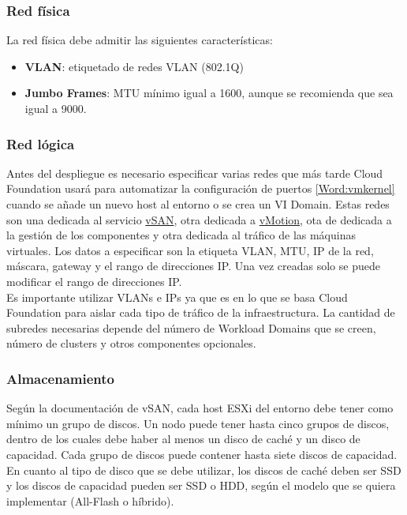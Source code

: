 \subsubsection{Red física}
\label{subsubsec:redFisica}
La red física debe admitir las siguientes características:
\begin{itemize}
    \item \textbf{VLAN}: etiquetado de redes VLAN (802.1Q)
    \item \textbf{Jumbo Frames}: MTU mínimo igual a 1600, aunque se recomienda que sea igual a 9000.
\end{itemize}

\subsubsection{Red lógica}
\label{subsubsec:redLogicaCF}
Antes del despliegue es necesario especificar varias redes que más tarde Cloud Foundation usará para automatizar la configuración de puertos \ref{Word:vmkernel} cuando se añade un nuevo host al entorno o se crea un VI Domain. Estas redes son  una dedicada al servicio \underline{vSAN}, otra dedicada a \underline{vMotion}, ota de dedicada a la gestión de los componentes y otra dedicada al tráfico de las máquinas virtuales. Los datos a especificar son la etiqueta VLAN, MTU, IP de la red, máscara, gateway y el rango de direcciones IP. Una vez creadas solo se puede modificar el rango de direcciones IP.\\
Es importante utilizar VLANs e IPs ya que es en lo que se basa Cloud Foundation para aislar cada tipo de tráfico de la infraestructura. La cantidad de subredes necesarias depende del número de Workload Domains que se creen, número de clusters y otros componentes opcionales.

\subsubsection{Almacenamiento}
Según la documentación de vSAN, cada host ESXi del entorno debe tener como mínimo un grupo de discos. Un nodo puede tener hasta cinco grupos de discos, dentro de los cuales debe haber al menos un disco de caché y un disco de capacidad. Cada grupo de discos puede contener hasta siete discos de capacidad.
En cuanto al tipo de disco que se debe utilizar, los discos de caché deben ser SSD y los discos de capacidad pueden ser SSD o HDD, según el modelo que se quiera implementar (All-Flash o híbrido).


